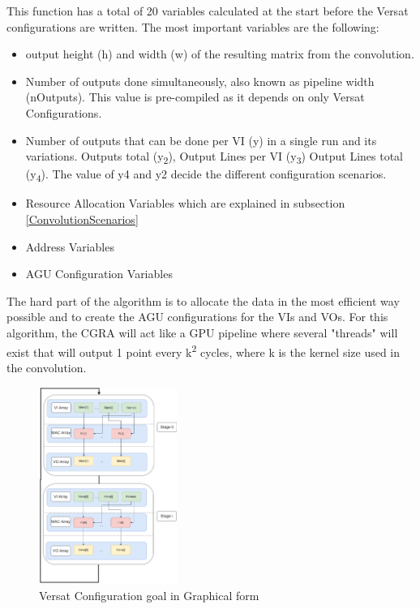 \documentclass[conference]{IEEEtran}
\begin{document}
This function has a total of 20 variables calculated at the start before the Versat configurations are written. The most important
variables are the following:

\begin{itemize}
	\item output height (h) and width (w) of the resulting matrix from the convolution.
	\item Number of outputs done simultaneously, also known as pipeline width (nOutputs). This value is pre-compiled as it depends on only Versat Configurations.
	\item Number of outputs that can be done per VI (y) in a single run and its variations. Outputs total (y\textsubscript{2}), Output Lines per VI (y\textsubscript{3}) Output Lines total (y\textsubscript{4}).
The value of y4 and y2 decide the different configuration scenarios.
	\item Resource Allocation Variables
which are explained in subsection \ref{ConvolutionScenarios}
	\item Address Variables
	\item AGU Configuration Variables
  \end{itemize}

The hard part of the algorithm is to allocate the data in the most efficient way possible and to create the AGU configurations
for the VIs and VOs. For this algorithm, the CGRA will act like a GPU pipeline where several "threads" will exist
that will output 1 point every k\textsuperscript{2} cycles, where k is the kernel size used in the convolution.

\begin{figure}[!htbp]
    \centering
    \includegraphics[width=0.4\textwidth]{Figures/Convolution.drawio.png}
    \caption{Versat Configuration goal in Graphical form}
    \label{VersatConfiguration}
\end{figure}
\end{document}
